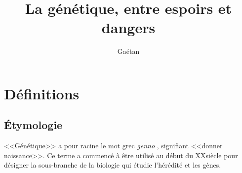 \documentclass{article}
\title{La génétique, entre espoirs et dangers}
\author{Gaétan \bsc{Bahl}}
\begin{document}
\maketitle

\tableofcontents

\section{Définitions}

\subsection{\uppercase{é}tymologie}

<<Génétique>> a pour racine le mot grec \emph{genno} , signifiant <<donner naissance>>. Ce terme a commencé à être utilisé au début du XX\ieme  siècle pour désigner la sous-branche de la biologie qui étudie l'hérédité et les gènes.
\end{document}
